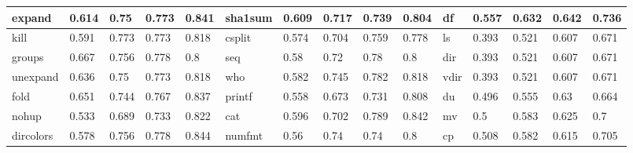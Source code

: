 \begin{table*}[h!]
\begin{center}
\begin{tabular}{ | l | l | l | l | l || l | l | l | l | l || l | l | l | l | l | }
	expand & 0.614 & 0.75 & 0.773 & 0.841 & sha1sum & 0.609 & 0.717 & 0.739 & 0.804 & df & 0.557 & 0.632 & 0.642 & 0.736 \\ \hline
	kill & 0.591 & 0.773 & 0.773 & 0.818 & csplit & 0.574 & 0.704 & 0.759 & 0.778 & ls & 0.393 & 0.521 & 0.607 & 0.671 \\ \hline
	groups & 0.667 & 0.756 & 0.778 & 0.8 & seq & 0.58 & 0.72 & 0.78 & 0.8 & dir & 0.393 & 0.521 & 0.607 & 0.671 \\ \hline
	unexpand & 0.636 & 0.75 & 0.773 & 0.818 & who & 0.582 & 0.745 & 0.782 & 0.818 & vdir & 0.393 & 0.521 & 0.607 & 0.671 \\ \hline
	fold & 0.651 & 0.744 & 0.767 & 0.837 & printf & 0.558 & 0.673 & 0.731 & 0.808 & du & 0.496 & 0.555 & 0.63 & 0.664 \\ \hline
	nohup & 0.533 & 0.689 & 0.733 & 0.822 & cat & 0.596 & 0.702 & 0.789 & 0.842 & mv & 0.5 & 0.583 & 0.625 & 0.7 \\ \hline
	dircolors & 0.578 & 0.756 & 0.778 & 0.844 & numfmt & 0.56 & 0.74 & 0.74 & 0.8 & cp & 0.508 & 0.582 & 0.615 & 0.705 \\ \hline
\end{tabular}

\end{center}
\end{table*}


